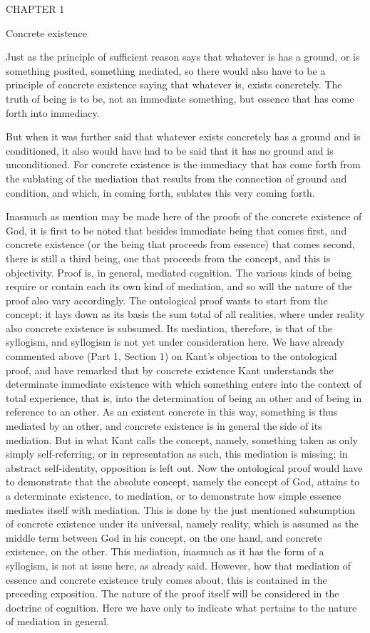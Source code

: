 CHAPTER 1

Concrete existence

Just as the principle of sufficient reason says
that whatever is has a ground,
or is something posited, something mediated,
so there would also have to be
a principle of concrete existence saying
that whatever is, exists concretely.
The truth of being is to be, 
not an immediate something,
but essence that has 
come forth into immediacy.

But when it was further said
that whatever exists concretely
has a ground and is conditioned,
it also would have had to be said
that it has no ground and is unconditioned.
For concrete existence is the immediacy
that has come forth from the sublating
of the mediation that results
from the connection of ground and condition,
and which, in coming forth,
sublates this very coming forth.

Inasmuch as mention may be made here of
the proofs of the concrete existence of God,
it is first to be noted that besides
immediate being that comes first,
and concrete existence
(or the being that proceeds from essence)
that comes second, there is still a third being,
one that proceeds from the concept,
and this is objectivity.
Proof is, in general, mediated cognition.
The various kinds of being require or contain
each its own kind of mediation,
and so will the nature of the proof also vary accordingly.
The ontological proof wants to start from the concept;
it lays down as its basis the sum total of all realities,
where under reality also concrete existence is subsumed.
Its mediation, therefore, is that of the syllogism,
and syllogism is not yet under consideration here.
We have already commented above (Part 1, Section 1)
on Kant's objection to the ontological proof,
and have remarked that by concrete existence
Kant understands the determinate immediate existence
with which something enters into the context of total experience,
that is, into the determination of being an other
and of being in reference to an other.
As an existent concrete in this way,
something is thus mediated by an other,
and concrete existence is in general the side of its mediation.
But in what Kant calls the concept, namely,
something taken as only simply self-referring,
or in representation as such, this mediation is missing;
in abstract self-identity, opposition is left out.
Now the ontological proof would have
to demonstrate that the absolute concept,
namely the concept of God,
attains to a determinate existence, to mediation,
or to demonstrate how simple essence
mediates itself with mediation.
This is done by the just mentioned
subsumption of concrete existence
under its universal, namely reality,
which is assumed as the middle term
between God in his concept, on the one hand,
and concrete existence, on the other.
This mediation, inasmuch as it has the form of a syllogism,
is not at issue here, as already said.
However, how that mediation of
essence and concrete existence truly comes about,
this is contained in the preceding exposition.
The nature of the proof itself will be considered
in the doctrine of cognition.
Here we have only to indicate what pertains
to the nature of mediation in general.


